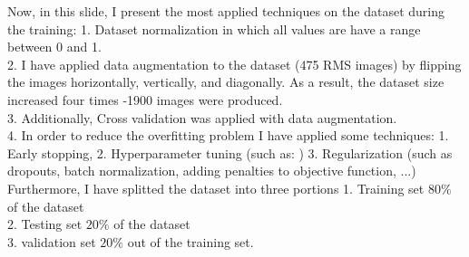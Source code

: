 \documentclass[10pt,aspectratio=169,dvipsnames]{beamer} %
\begin{document}
	\note
	{
		Now, in this slide, I present the most applied techniques on the dataset during the training:
		1. Dataset normalization in which all values are have a range between 0 and 1. \\
		2. I have applied data augmentation to the dataset
		(475 RMS images) by flipping the images horizontally, vertically, and diagonally.
		As a result, the dataset size increased four times -1900 images were produced. \\
		3. Additionally, Cross validation was applied with data augmentation. \\
		4. In order to reduce the overfitting problem I have applied some techniques:
		1. Early stopping,
		2. Hyperparameter tuning (such as: )
		3. Regularization (such as dropouts, batch normalization, adding penalties to objective function, ...)\\ 
		Furthermore, I have splitted the dataset into three portions
		1. Training set \(80\%\) of the dataset\\
		2. Testing set \(20\%\) of the dataset\\
		3. validation set \(20\%\) out of the training set.
	}
\end{document}
